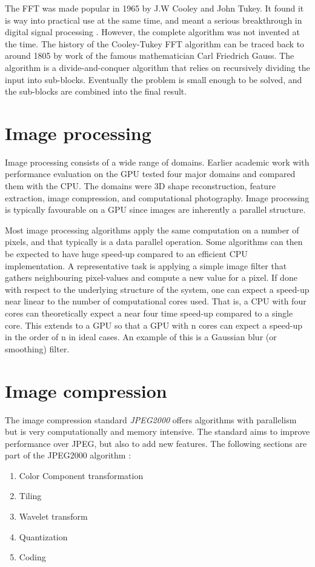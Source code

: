 The FFT was made popular in 1965 \cite{cooley1965algorithm} by J.W Cooley and John Tukey. It found it is way into practical use at the same time, and meant a serious breakthrough in digital signal processing \cite{cooley1969fast, brigham1967fast}. However, the complete algorithm was not invented at the time. The history of the Cooley-Tukey \gls{FFT} algorithm can be traced back to around 1805 by work of the famous mathematician Carl Friedrich Gauss\cite{heideman1984gauss}. The algorithm is a divide-and-conquer algorithm that relies on recursively dividing the input into sub-blocks. Eventually the problem is small enough to be solved, and the sub-blocks are combined into the final result.

\section{Image processing}
Image processing consists of a wide range of domains. Earlier academic work with performance evaluation on the \gls{GPU} \cite{park2011design} tested four major domains and compared them with the \gls{CPU}. The domains were \gls{3D} shape reconstruction, feature extraction, image compression, and computational photography. Image processing is typically favourable on a \gls{GPU} since images are inherently a parallel structure.

Most image processing algorithms apply the same computation on a number of pixels, and that typically is a data parallel operation. Some algorithms can then be expected to have huge speed-up compared to an efficient \gls{CPU} implementation. A representative task is applying a simple image filter that gathers neighbouring pixel-values and compute a new value for a pixel. If done with respect to the underlying structure of the system, one can expect a speed-up near linear to the number of computational cores used. That is, a \gls{CPU} with four cores can theoretically expect a near four time speed-up compared to a single core. This extends to a \gls{GPU} so that a \gls{GPU} with n cores can expect a speed-up in the order of n in ideal cases. An example of this is a Gaussian blur (or smoothing) filter.

\section{Image compression}
The image compression standard \emph{JPEG2000} offers algorithms with parallelism but is very computationally and memory intensive. The standard aims to improve performance over JPEG, but also to add new features. The following sections are part of the JPEG2000 algorithm \cite{christopoulos2000jpeg2000}:
\begin{enumerate}
	\item Color Component transformation
	\item Tiling
	\item Wavelet transform
	\item Quantization
	\item Coding
\end{enumerate}

